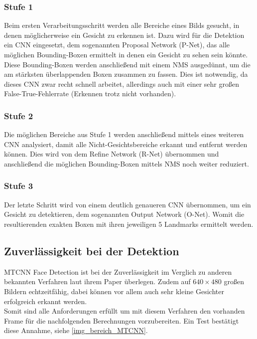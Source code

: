 \subsubsection{Stufe 1}
Beim ersten Verarbeitungsschritt werden alle Bereiche eines Bilds gesucht, in denen möglicherweise ein Gesicht zu erkennen ist. Dazu wird für die Detektion ein CNN eingesetzt, dem sogenannten Proposal Network (P-Net), das alle möglichen Bounding-Boxen ermittelt in denen ein Gesicht zu sehen sein könnte. Diese Bounding-Boxen werden anschließend mit einem NMS ausgedünnt, um die am stärksten überlappenden Boxen zusammen zu fassen. Dies ist notwendig, da dieses CNN zwar recht schnell arbeitet, allerdings auch mit einer sehr großen False-True-Fehlerrate (Erkennen trotz nicht vorhanden).
\subsubsection{Stufe 2}
Die möglichen Bereiche aus Stufe 1 werden anschließend mittels eines weiteren CNN analysiert, damit alle Nicht-Gesichtsbereiche erkannt und entfernt werden können. Dies wird von dem Refine Network (R-Net) übernommen und anschließend die möglichen Bounding-Boxen mittels NMS noch weiter reduziert.
\subsubsection{Stufe 3}
Der letzte Schritt wird von einem deutlich genaueren CNN übernommen, um ein Gesicht zu detektieren, dem sogenannten Output Network (O-Net). Womit die resultierenden exakten Boxen mit ihren jeweiligen 5 Landmarks ermittelt werden.
\subsection{Zuverlässigkeit bei der Detektion}
MTCNN Face Detection ist bei der Zuverlässigkeit im Verglich zu anderen bekannten Verfahren laut ihrem Paper \cite{MTCCN} überlegen. Zudem auf $640\times 480$ großen Bildern echtzeitfähig, dabei können vor allem auch sehr kleine Gesichter erfolgreich erkannt werden.\\
Somit sind alle Anforderungen erfüllt um mit diesem Verfahren den vorhanden Frame für die nachfolgenden Berechnungen vorzubereiten. Ein Test bestätigt diese Annahme, siehe \autoref{img_bereich_MTCNN}.
